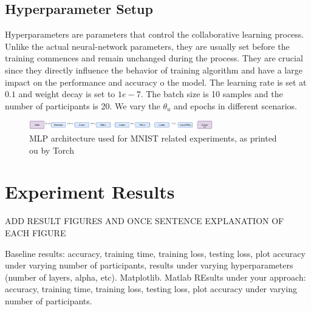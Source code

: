 \documentclass[conference]{IEEEtran}
\begin{document}
\subsection{Hyperparameter Setup}

Hyperparameters are parameters that control the collaborative learning process. Unlike the actual neural-network parameters, they are usually set before the training commences and remain unchanged during the process.
They are crucial since they directly influence the behavior of training algorithm and have a large impact on the performance and accuracy o the model.
The learning rate is set at $0.1$ and weight decay is set to $1e-7$. The batch size is 10 samples and the number of participants is 20. We vary the $\theta_u$ and epochs in different scenarios. 

\begin{figure}[!h]
\includegraphics[width=8cm, keepaspectratio]{MLPArchitecture}
\caption{MLP architecture used for MNIST related experiments, as printed ou by Torch}
\label{fig:MLPArch}

\end{figure}





\section{Experiment Results}
ADD RESULT FIGURES AND ONCE SENTENCE EXPLANATION OF EACH FIGURE

Baseline results: accuracy, training time, training loss, testing loss, plot accuracy under varying number of participants, results
under varying hyperparameters (number of layers, alpha, etc). Matplotlib. Matlab
REsults under your approach: accuracy, training time, training loss, testing loss, plot accuracy under varying number of participants.
\end{document}
